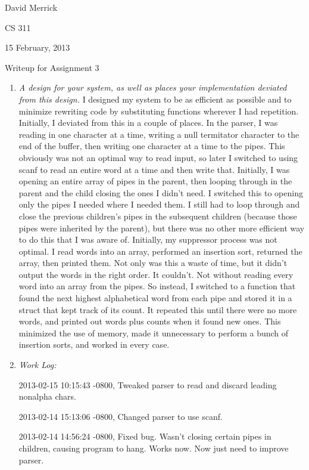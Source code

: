 \documentclass[letterpaper,10pt,titlepage]{article}
\begin{document}
David Merrick

CS 311

15 February, 2013

\begin{center}
{\LARGE Writeup for Assignment 3}
\end{center}

\begin{enumerate}

\item \emph{A design for your system, as well as places your implementation deviated from this design.}
I designed my system to be as efficient as possible and to minimize rewriting code by substituting functions wherever I had repetition. Initially, I deviated from this in a couple of places. In the parser, I was reading in one character at a time, writing a null termitator character to the end of the buffer, then writing one character at a time to the pipes. This obviously was not an optimal way to read input, so later I switched to using scanf to read an entire word at a time and then write that. Initially, I was opening an entire array of pipes in the parent, then looping through in the parent and the child closing the ones I didn't need. I switched this to opening only the pipes I needed where I needed them. I still had to loop through and close the previous children's pipes in the subsequent children (because those pipes were inherited by the parent), but there was no other more efficient way to do this that I was aware of. Initially, my suppressor process was not optimal. I read words into an array, performed an insertion sort, returned the array, then printed them. Not only was this a waste of time, but it didn't output the words in the right order. It couldn't. Not without reading every word into an array from the pipes. So instead, I switched to a function that found the next highest alphabetical word from each pipe and stored it in a struct that kept track of its count. It repeated this until there were no more words, and printed out words plus counts when it found new ones. This minimized the use of memory, made it unnecessary to perform a bunch of insertion sorts, and worked in every case. 

\item \emph{Work Log:}

2013-02-15 10:15:43 -0800, Tweaked parser to read and discard leading nonalpha chars.

2013-02-14 15:13:06 -0800, Changed parser to use scanf.

2013-02-14 14:56:24 -0800, Fixed bug. Wasn't closing certain pipes in children, causing program to hang. Works now. Now just need to improve parser.


\end{enumerate}
\end{document}
